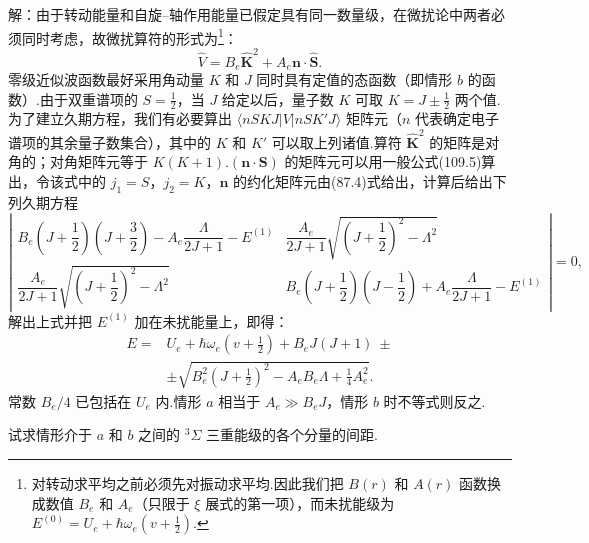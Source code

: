 \begin{xiti}
解：由于转动能量和自旋–轴作用能量已假定具有同一数量级，在微扰论中两者必须同时考虑，故微扰算符的形式为\footnote{对转动求平均之前必须先对振动求平均.因此我们把 $B(r)$ 和 $A(r)$ 函数换成数值 $B_e$ 和 $A_e$（只限于 $\xi$ 展式的第一项），而未扰能级为 $E^{(0)}=U_e+\hbar\omega_e\left(v+\frac{1}{2}\right)$.}：
\begin{equation*}
  \hat{V}=B_e\hat{\boldsymbol{K}}^2+A_e\boldsymbol{n}\cdot\hat{\boldsymbol{S}}.
\end{equation*}
零级近似波函数最好采用角动量 $K$ 和 $J$ 同时具有定值的态函数（即情形 $b$ 的函数）.由于双重谱项的 $S=\frac{1}{2}$，当 $J$ 给定以后，量子数 $K$ 可取 $K=J\pm\frac{1}{2}$ 两个值.为了建立久期方程，我们有必要算出 $\langle nSKJ|V|nSK'J\rangle$ 矩阵元（$n$ 代表确定电子谱项的其余量子数集合），其中的 $K$ 和 $K'$ 可以取上列诸值.算符 $\hat{\boldsymbol{K}}^2$ 的矩阵是对角的；对角矩阵元等于 $K(K+1)$.$(\boldsymbol{n}\cdot\boldsymbol{S})$ 的矩阵元可以用一般公式(109.5)算出，令该式中的 $j_1=S$，$j_2=K$，$\boldsymbol{n}$ 的约化矩阵元由(87.4)式给出，计算后给出下列久期方程
\begin{equation*}
  \left|\begin{array}{cc}
    B_e\left(J+\dfrac{1}{2}\right)\left(J+\dfrac{3}{2}\right)
    -A_e\dfrac{\Lambda}{2J+1}-E^{(1)} &
    \dfrac{A_e}{2J+1}\sqrt{\left(J+\dfrac{1}{2}\right)^2-\Lambda^2}\\[3ex]
    \dfrac{A_e}{2J+1}\sqrt{\left(J+\dfrac{1}{2}\right)^2-\Lambda^2} &
    B_e\left(J+\dfrac{1}{2}\right)\left(J-\dfrac{1}{2}\right)
    +A_e\dfrac{\Lambda}{2J+1}-E^{(1)}
  \end{array}\right|=0,
\end{equation*}
解出上式并把 $E^{(1)}$ 加在未扰能量上，即得：
\begin{equation*}
\begin{aligned}
  E={}&U_e+\hbar\omega_e\left(v+\frac{1}{2}\right)+B_eJ(J+1)\ \pm\\
  &\pm\sqrt{B_e^2\left(J+\frac{1}{2}\right)^2-A_eB_e\Lambda+\frac{1}{4}A_e^2}.
\end{aligned}
\end{equation*}
常数 $B_e/4$ 已包括在 $U_e$ 内.情形 $a$ 相当于 $A_e\gg B_eJ$，情形 $b$ 时不等式则反之.

\quad 试求情形介于 $a$ 和 $b$ 之间的 $^3\Sigma$ 三重能级的各个分量的间距.


\end{xiti}
